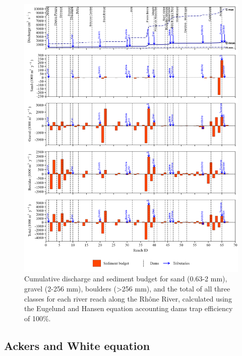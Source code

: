 \documentclass[
]{book}
\begin{document}
\begin{figure}
\includegraphics[width=26.24in]{img/res_cascade/res_E3_eE&H/plots_sed_budget-silt/sed_bud_res_sum_hy_E3_eE&H} \caption{Cumulative discharge and sediment budget for sand (0.63-2 mm), gravel (2-256 mm), boulders (>256 mm), and the total of all three classes for each river reach along the Rhône River, calculated using the Eugelund and Hansen equation accounting dams trap efficiency of 100\%.}\label{fig:budgetE3eE}
\end{figure}

\subsection{Ackers and White equation}\label{ackers-and-white-equation-1}
\end{document}
